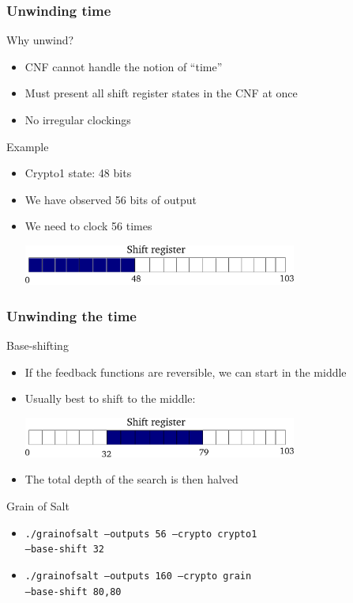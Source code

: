 \documentclass[xcolor=usenames,xcolor=svgnames,table,slidestop,compress,mathserif]{beamer}
\begin{document}
\frame
{\frametitle{Unwinding time}
\begin{beamerboxesrounded}[shadow=true]{Why unwind?}
\begin{itemize}
 \item CNF cannot handle the notion of ``time''
 \item Must present all shift register states in the CNF at once
 \item No irregular clockings
\end{itemize}
\end{beamerboxesrounded}

\bigskip

\begin{beamerboxesrounded}[shadow=true]{Example}
\begin{itemize}
 \item Crypto1 state: 48 bits
 \item We have observed 56 bits of output
 \item We need to clock 56 times
 
 \smallskip
 \includegraphics[width=9cm]{shifting/unwind}
\end{itemize}
\end{beamerboxesrounded}
}

\frame
{\frametitle{Unwinding the time}
\begin{beamerboxesrounded}[shadow=true]{Base-shifting}
\begin{itemize}
\item If the feedback functions are reversible, we can start in the middle
\item Usually best to shift to the middle:

\smallskip
\includegraphics[width=9cm]{shifting/shifting}

\item The total depth of the search is then halved
\end{itemize}
\end{beamerboxesrounded}

\bigskip

\begin{beamerboxesrounded}[shadow=true]{Grain of Salt}
\begin{itemize}
\item \texttt{./grainofsalt --outputs 56 --crypto crypto1\\
                            \qquad \qquad \qquad \quad --base-shift 32}
\item \texttt{./grainofsalt --outputs 160 --crypto grain\\
                            \qquad \qquad \qquad \quad --base-shift 80,80}
\end{itemize}
\end{beamerboxesrounded}
}
\end{document}
